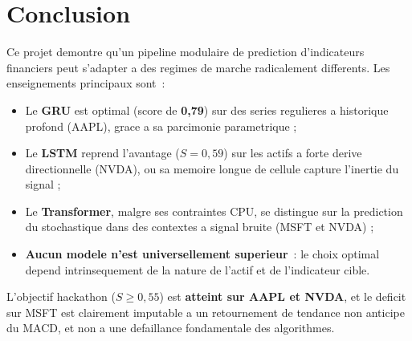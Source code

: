 \documentclass[12pt, a4paper]{article}
\begin{document}
\section{Conclusion}

Ce projet demontre qu'un pipeline modulaire de prediction d'indicateurs financiers peut s'adapter a des regimes de marche radicalement differents. Les enseignements principaux sont~:

\begin{itemize}
  \item Le \textbf{GRU} est optimal (score de \textbf{0,79}) sur des series regulieres a historique profond (AAPL), grace a sa parcimonie parametrique ;
  \item Le \textbf{LSTM} reprend l'avantage ($S = 0{,}59$) sur les actifs a forte derive directionnelle (NVDA), ou sa memoire longue de cellule capture l'inertie du signal ;
  \item Le \textbf{Transformer}, malgre ses contraintes CPU, se distingue sur la prediction du stochastique dans des contextes a signal bruite (MSFT et NVDA) ;
  \item \textbf{Aucun modele n'est universellement superieur}~: le choix optimal depend intrinsequement de la nature de l'actif et de l'indicateur cible.
\end{itemize}

L'objectif hackathon ($S \geq 0{,}55$) est \textbf{atteint sur AAPL et NVDA}, et le deficit sur MSFT est clairement imputable a un retournement de tendance non anticipe du MACD, et non a une defaillance fondamentale des algorithmes.
\end{document}
